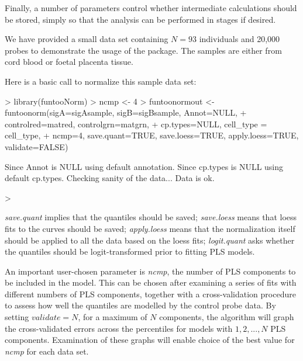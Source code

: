 \documentclass{article}
\begin{document}
Finally, a number of parameters control whether intermediate calculations should be stored, simply so that the analysis can be performed in stages if desired.

We have provided a small data set containing $N=93$ individuals and 20,000 probes to demonstrate the usage of the package. 
The samples are either from cord blood or foetal placenta tissue. 

Here is a basic call to normalize this sample data set: 
\begin{Schunk}
\begin{Sinput}
>     library(funtooNorm)
>     ncmp <- 4
>     funtoonormout <- funtoonorm(sigA=sigAsample, sigB=sigBsample, Annot=NULL, 
+                       controlred=matred, controlgrn=matgrn, 
+                       cp.types=NULL, cell_type = cell_type,
+                       ncmp=4, save.quant=TRUE, save.loess=TRUE, apply.loess=TRUE, validate=FALSE)
\end{Sinput}
\begin{Soutput}
Since Annot is NULL using default annotation. 
Since cp.types is NULL using default cp.types. 
Checking sanity of the data... 
Data is ok. 
\end{Soutput}
\begin{Sinput}
> 
\end{Sinput}
\end{Schunk}

\emph{save.quant} implies that the quantiles should be saved;  \emph{save.loess} means that loess fits to the curves should be saved; \emph{apply.loess} means that the normalization itself should be applied to all the data based on the loess fits;  \emph{logit.quant} asks whether the quantiles should be logit-transformed prior to fitting PLS models.

An important user-chosen parameter is  \emph{ncmp}, the number of PLS components to be included in the model.  
This can be chosen after examining a series of fits with different numbers of PLS components, together with a cross-validation procedure to assess how well the quantiles are modelled by the control probe data.  
By setting $validate=N$, for a maximum of $N$ components, the algorithm will graph the cross-validated errors across the percentiles for
models with $1, 2, ... , N$ PLS components.  
Examination of these graphs will enable choice of the best value for \emph{ncmp} for each data set.
\end{document}

